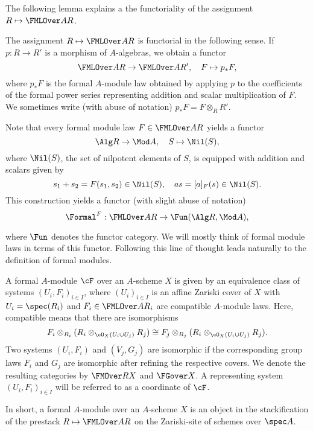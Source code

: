 \documentclass[../main.tex]{subfiles}
\begin{document}
The following lemma explains a the functoriality of the assignment
$R \mapsto \FMLOver A R$.

\begin{lem}\label{lem:FMLFunc}
  The assignment $R \mapsto \FMLOver A R$ is functorial in the following sense.
  If $p: R \to R'$ is a morphism of $A$-algebras, we obtain a functor
  \begin{equation*}
    \FMLOver A R \to \FMLOver A {R'}, \quad F \mapsto p_*F,
  \end{equation*}
  where $p_*F$ is the formal $A$-module law obtained by applying $p$ to the
  coefficients of the formal power series representing addition
  and scalar multiplication of $F$. We sometimes write
  (with abuse of notation) $p_* F = F \otimes_R R'$. 
\end{lem}

Note that every formal module law $F \in \FMLOver A R$ yields a functor
\begin{equation*}
  \Alg R \to \Mod A, \quad S \mapsto \Nil(S),
\end{equation*}
where $\Nil(S)$, the set of nilpotent elements of $S$, is equipped with
addition and scalars given by 
\begin{equation*}
  s_1 + s_2 = F(s_1, s_2) \in \Nil(S), \quad a s = [a]_F(s) \in \Nil(S).
\end{equation*}
This construction yields a functor (with slight abuse of notation)
\begin{equation*}
  \Formal^F: \FMLOver A R \to \Fun(\Alg R, \Mod A),
\end{equation*}

where $\Fun$ denotes the functor category. We will mostly think of formal 
module laws in terms of this functor. Following this line of thought leads 
naturally to the definition of formal modules. 

\begin{defi}
  A formal $A$-module $\cF$ over an $A$-scheme $X$ is given by an equivalence class
  of systems $(U_i, F_i)_{i \in I}$, where $(U_i)_{i \in I}$ is an affine
  Zariski cover of $X$ with $U_i = \spec(R_i)$ and $F_i \in \FMLOver A {R_i}$
  are compatible $A$-module laws. Here, compatible means that there are
  isomorphisms
  \begin{equation*}
    F_i \otimes_{R_i} (R_i \otimes_{\cO_X(U_i \cup U_j)} R_j)  \cong F_j
    \otimes_{R_j} (R_i \otimes_{\cO_X(U_i \cup U_j)} R_j).
  \end{equation*}
  Two systems $(U_i, F_i)$ and 
  $(V_j, G_j)$ are isomorphic if the corresponding group laws
  $F_i$ and $G_j$ are isomorphic after refining the respective covers. 
  We denote the resulting categories by $\FMOver R X$ and $\FGover X$.
  A representing system $(U_i, F_i)_{i \in I}$ will be referred to as 
  a coordinate of $\cF$.
  
\end{defi}
In short, a formal $A$-module over an $A$-scheme $X$ is an
object in the stackification of the prestack $R \mapsto \FMLOver A R$ on 
the Zariski-site of schemes over $\spec A$. 
\end{document}
